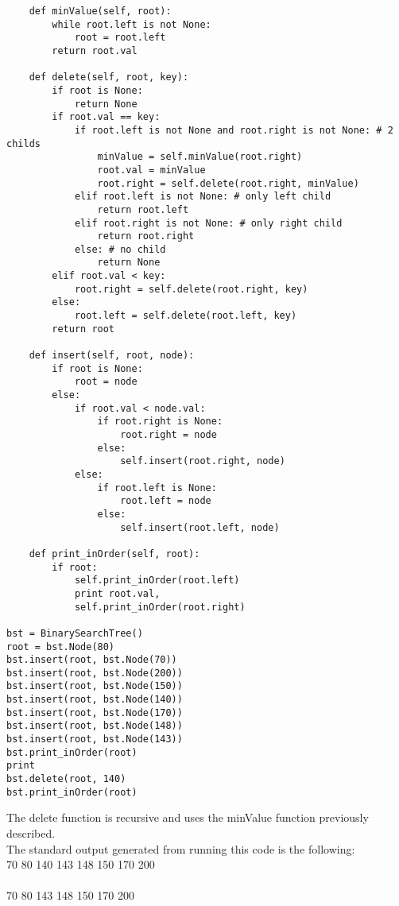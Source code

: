 \documentclass[11pt]{article}
\begin{document}
\begin{enumerate}
\begin{enumerate}
\begin{verbatim}
    def minValue(self, root):
        while root.left is not None:
            root = root.left
        return root.val
        
    def delete(self, root, key):
        if root is None:
            return None
        if root.val == key:
            if root.left is not None and root.right is not None: # 2 childs
                minValue = self.minValue(root.right)
                root.val = minValue
                root.right = self.delete(root.right, minValue)                    
            elif root.left is not None: # only left child
                return root.left
            elif root.right is not None: # only right child
                return root.right
            else: # no child
                return None
        elif root.val < key:
            root.right = self.delete(root.right, key)
        else:
            root.left = self.delete(root.left, key)
        return root
        
    def insert(self, root, node):
        if root is None:
            root = node
        else:
            if root.val < node.val:
                if root.right is None:
                    root.right = node
                else:
                    self.insert(root.right, node)
            else:
                if root.left is None:
                    root.left = node
                else:
                    self.insert(root.left, node)
                    
    def print_inOrder(self, root):
        if root:
            self.print_inOrder(root.left)
            print root.val,
            self.print_inOrder(root.right)
            
bst = BinarySearchTree()
root = bst.Node(80)
bst.insert(root, bst.Node(70))
bst.insert(root, bst.Node(200))
bst.insert(root, bst.Node(150))
bst.insert(root, bst.Node(140))
bst.insert(root, bst.Node(170))
bst.insert(root, bst.Node(148))
bst.insert(root, bst.Node(143))
bst.print_inOrder(root)
print
bst.delete(root, 140)
bst.print_inOrder(root)
        \end{verbatim}
        The delete function is recursive and uses the minValue function previously described.
        \\ The standard output generated from running this code is the following:
        \\ 70 80 140 143 148 150 170 200
        \\\\ 70 80 143 148 150 170 200
    \end{enumerate}
    

\end{enumerate}
\end{document}
